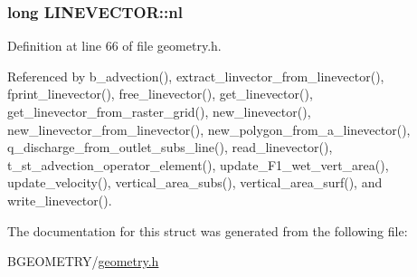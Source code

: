 \hypertarget{struct_l_i_n_e_v_e_c_t_o_r_a971db14a2f0d6e0c0d75faa36a477be1}{
\subsubsection[{nl}]{\setlength{\rightskip}{0pt plus 5cm}long L\-I\-N\-E\-V\-E\-C\-T\-O\-R\-::nl}}\label{struct_l_i_n_e_v_e_c_t_o_r_a971db14a2f0d6e0c0d75faa36a477be1}


Definition at line 66 of file geometry.\-h.



Referenced by b\-\_\-advection(), extract\-\_\-linvector\-\_\-from\-\_\-linevector(), fprint\-\_\-linevector(), free\-\_\-linevector(), get\-\_\-linevector(), get\-\_\-linevector\-\_\-from\-\_\-raster\-\_\-grid(), new\-\_\-linevector(), new\-\_\-linevector\-\_\-from\-\_\-linevector(), new\-\_\-polygon\-\_\-from\-\_\-a\-\_\-linevector(), q\-\_\-discharge\-\_\-from\-\_\-outlet\-\_\-subs\-\_\-line(), read\-\_\-linevector(), t\-\_\-st\-\_\-advection\-\_\-operator\-\_\-element(), update\-\_\-\-F1\-\_\-wet\-\_\-vert\-\_\-area(), update\-\_\-velocity(), vertical\-\_\-area\-\_\-subs(), vertical\-\_\-area\-\_\-surf(), and write\-\_\-linevector().



The documentation for this struct was generated from the following file\-:\begin{DoxyCompactItemize}
\item 
B\-G\-E\-O\-M\-E\-T\-R\-Y/\hyperlink{geometry_8h}{geometry.\-h}\end{DoxyCompactItemize}
